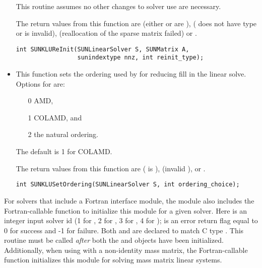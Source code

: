 \begin{itemize}
  This routine assumes no other changes to solver use are necessary.

  The return values from this function are 
  (either  or  are ), 
  ( does not have type  or
   is invalid),  (reallocation
  of the sparse matrix failed) or .
  
\begin{verbatim}
int SUNKLUReInit(SUNLinearSolver S, SUNMatrix A, 
                 sunindextype nnz, int reinit_type);
\end{verbatim}



\item {}

  This function sets the ordering used by {\klu} for reducing fill in
  the linear solve.  Options for  are:
  \begin{itemize}
  \item[0] AMD,
  \item[1] COLAMD, and
  \item[2] the natural ordering.
  \end{itemize}
  The default is 1 for COLAMD.

  The return values from this function are 
  ( is ), 
  (invalid ), or .
  
  \verb|int SUNKLUSetOrdering(SUNLinearSolver S, int ordering_choice);|

\end{itemize}
For solvers that include a Fortran interface module, the
{\sunlinsolklu} module also includes the Fortran-callable
function  to initialize this
{\sunlinsolklu} module for a given {\sundials} solver.  Here 
is an integer input solver id (1 for {\cvode}, 2 for {\ida}, 3 for {\kinsol},
4 for {\arkode});  is an error return flag equal to 0 for success
and -1 for failure. Both  and 
are declared to match C type . This
routine must be called \emph{after} both the {\nvector} and
{\sunmatrix} objects have been initialized.  Additionally, when using
{\arkode} with a non-identity mass matrix, the Fortran-callable function
 initializes this {\sunlinsolklu} module for
solving mass matrix linear systems.

